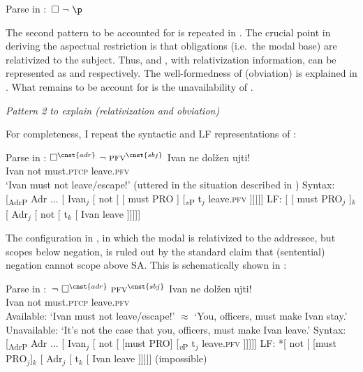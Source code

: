 \documentclass[output=paper,
modfonts,
newtxmath,colorlinks,citecolor=brown
]{langscibook}
\begin{document}
\ea  Parse in :  $\,\Box\ \neg\ \p$ \label{detailsp1d}
	\z \z 
    
\noindent The second pattern to be accounted for is repeated in . The crucial point in deriving the aspectual restriction 
is that obligations (i.e.\ the modal base) are relativized to the subject. Thus,  and , with relativization information, can be represented as  and  respectively. The well-formedness of  (obviation) is explained in . What remains to be account for is  the unavailability of .

\ea \textit{Pattern 2 to explain (relativization and obviation)}\label{pattern2} 
\z \z

\noindent For completeness, I repeat the syntactic and LF representations of :

\ea Parse in :  $\Box^{\cnst{adr}}\ \neg\ \textsc{pfv}^{\cnst{sbj}}$ \label{detailsp2d}
	\ea \gll  Ivan ne dolžen ujti! \\
	Ivan  not must.\textsc{ptcp} leave.\textsc{pfv} \\
	\glt `Ivan must not leave/escape!' \hfill (uttered in the situation described in ) 
	\ex Syntax:  [\textsubscript{AdrP} Adr ...  [ Ivan$_j$  [ not [ [ must PRO ] [\textsubscript{\textit{v}P} t$_j$ leave.\textsc{pfv} ]]]]]
	\ex LF:  [ [ must PRO$_j$ ]$_k$ [ Adr$_j$ [ not [ t$_k$ [ Ivan leave  ]]]]]
        \z \z 

\noindent The configuration in , in which the modal is relativized to the addressee, but scopes below negation, is ruled out by the standard claim that (sentential) negation cannot scope above  SA. This is schematically shown in :

\ea Parse in :  $\,\neg\ \Box^{\cnst{adr}}\ \textsc{pfv}^{\cnst{sbj}}$ \label{detailsp2c}
	\ea \gll Ivan ne dolžen ujti! \\
	Ivan  not must.\textsc{ptcp} leave.\textsc{pfv} \\
	\glt Available: `Ivan must not leave/escape!' $\approx$ `You, officers, must make Ivan stay.' \\
	Unavailable: `It's not the case that you, officers, must make Ivan leave.'
	\ex Syntax:  [\textsubscript{AdrP} Adr ... [ Ivan$_j$  [ not [ [must PRO] [\textsubscript{\textit{v}P} t$_j$ leave.\textsc{pfv} ]]]]]
	\ex LF: *[ not [ [must PRO$_j$]$_k$ [ Adr$_j$ [ t$_k$ [ Ivan leave  ]]]]]	\hfill (impossible)
        \z \z 
        
\end{document}
